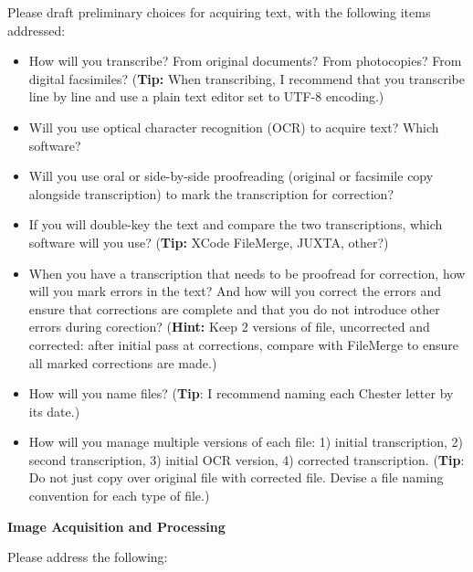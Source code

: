\documentclass[9pt,oneside,notitlepageletterpaperopenright]{article}
\begin{document}
Please draft preliminary choices for acquiring text, with the following
items addressed:

\begin{itemize}
\itemsep1pt\parskip0pt
\item
  How will you transcribe? From original documents? From photocopies?
  From digital facsimiles? (\textbf{Tip:} When transcribing, I recommend
  that you transcribe line by line and use a plain text editor set to
  UTF-8 encoding.)
\item
  Will you use optical character recognition (OCR) to acquire text?
  Which software?
\item
  Will you use oral or side-by-side proofreading (original or facsimile
  copy alongside transcription) to mark the transcription for
  correction?
\item
  If you will double-key the text and compare the two transcriptions,
  which software will you use? (\textbf{Tip:} XCode FileMerge, JUXTA,
  other?)
\item
  When you have a transcription that needs to be proofread for
  correction, how will you mark errors in the text? And how will you
  correct the errors and ensure that corrections are complete and that
  you do not introduce other errors during corection? (\textbf{Hint:}
  Keep 2 versions of file, uncorrected and corrected: after initial pass
  at corrections, compare with FileMerge to ensure all marked
  corrections are made.)
\item
  How will you name files? (\textbf{Tip}: I recommend naming each
  Chester letter by its date.)
\item
  How will you manage multiple versions of each file: 1) initial
  transcription, 2) second transcription, 3) initial OCR version, 4)
  corrected transcription. (\textbf{Tip}: Do not just copy over original
  file with corrected file. Devise a file naming convention for each
  type of file.)
\end{itemize}

\textbf{Image Acquisition and Processing}

Please address the following:
\end{document}
